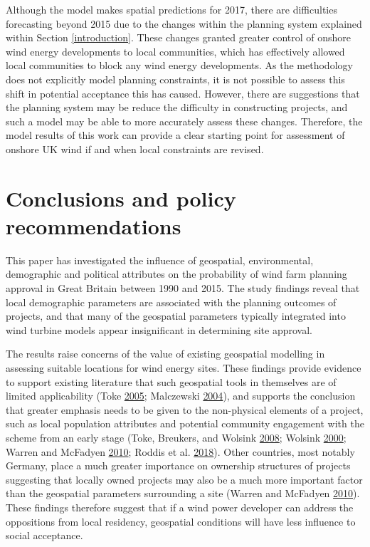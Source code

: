 \documentclass[a4paper,]{article}
\theoremstyle{definition}
\theoremstyle{definition}
\theoremstyle{definition}
\theoremstyle{remark}
\begin{document}
Although the model makes spatial predictions for 2017, there are
difficulties forecasting beyond 2015 due to the changes within the
planning system explained within Section \ref{introduction}. These
changes granted greater control of onshore wind energy developments to
local communities, which has effectively allowed local communities to
block any wind energy developments. As the methodology does not
explicitly model planning constraints, it is not possible to assess this
shift in potential acceptance this has caused. However, there are
suggestions that the planning system may be reduce the difficulty in
constructing projects, and such a model may be able to more accurately
assess these changes. Therefore, the model results of this work can
provide a clear starting point for assessment of onshore UK wind if and
when local constraints are revised.

\hypertarget{conclusions-and-policy-recommendations}{%
\section{Conclusions and policy
recommendations}\label{conclusions-and-policy-recommendations}}

This paper has investigated the influence of geospatial, environmental,
demographic and political attributes on the probability of wind farm
planning approval in Great Britain between 1990 and 2015. The study
findings reveal that local demographic parameters are associated with
the planning outcomes of projects, and that many of the geospatial
parameters typically integrated into wind turbine models appear
insignificant in determining site approval.

The results raise concerns of the value of existing geospatial modelling
in assessing suitable locations for wind energy sites. These findings
provide evidence to support existing literature that such geospatial
tools in themselves are of limited applicability (Toke
\protect\hyperlink{ref-Toke2005}{2005}; Malczewski
\protect\hyperlink{ref-Malczewski2004}{2004}), and supports the
conclusion that greater emphasis needs to be given to the non-physical
elements of a project, such as local population attributes and potential
community engagement with the scheme from an early stage (Toke,
Breukers, and Wolsink \protect\hyperlink{ref-Toke2008}{2008}; Wolsink
\protect\hyperlink{ref-Wolsink2000}{2000}; Warren and McFadyen
\protect\hyperlink{ref-Warren2010}{2010}; Roddis et al.
\protect\hyperlink{ref-Roddis2018}{2018}). Other countries, most notably
Germany, place a much greater importance on ownership structures of
projects suggesting that locally owned projects may also be a much more
important factor than the geospatial parameters surrounding a site
(Warren and McFadyen \protect\hyperlink{ref-Warren2010}{2010}). These
findings therefore suggest that if a wind power developer can address
the oppositions from local residency, geospatial conditions will have
less influence to social acceptance.
\end{document}
